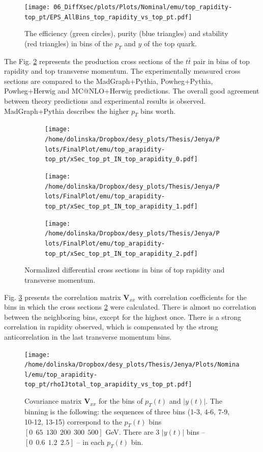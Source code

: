 \begin{figure}[t]
  \centering
  \texttt{[image: 06\_DiffXsec/plots/Plots/Nominal/emu/top\_rapidity-top\_pt/EPS\_AllBins\_top\_rapidity\_vs\_top\_pt.pdf]}
  \caption{The efficiency (green circles), purity (blue triangles) and stability (red triangles) in bins of the $p_{T}$ and $y$ of the top quark.}
  \label{fig:EPS_2D_y_pt}
\end{figure}

The Fig. \ref{fig:XS_2D_y_pt} represents the production cross sections of the $t\bar{t}$ pair in bins of top rapidity and top transverse momentum.
The experimentally measured cross sections are compared to the MadGraph+Pythia, Powheg+Pythia, Powheg+Herwig and MC@NLO+Herwig predictions.
The overall good agreement between theory predictions and experimental results is observed. MadGraph+Pythia describes the higher $p_{T}$ bins
worth.

\begin{figure}[p]
\centering
\begin{subfigure}
  \centering
  \texttt{[image: /home/dolinska/Dropbox/desy\_plots/Thesis/Jenya/Plots/FinalPlot/emu/top\_arapidity-top\_pt/xSec\_top\_pt\_IN\_top\_arapidity\_0.pdf]}
\end{subfigure}
\begin{subfigure}
  \centering
  \texttt{[image: /home/dolinska/Dropbox/desy\_plots/Thesis/Jenya/Plots/FinalPlot/emu/top\_arapidity-top\_pt/xSec\_top\_pt\_IN\_top\_arapidity\_1.pdf]}
\end{subfigure}
\begin{subfigure}
  \centering
  \texttt{[image: /home/dolinska/Dropbox/desy\_plots/Thesis/Jenya/Plots/FinalPlot/emu/top\_arapidity-top\_pt/xSec\_top\_pt\_IN\_top\_arapidity\_2.pdf]}
\end{subfigure}
\caption{Normalized differential cross sections in bins of top rapidity and transverse momentum.}
\label{fig:XS_2D_y_pt}
\end{figure}

Fig. \ref{fig:corr_matr} presents the correlation matrix $\mathbf{V}_{xx}$ with correlation coefficients for the bins in which the 
cross sections \ref{fig:XS_2D_y_pt} were calculated. There is almost no correlation between the neighboring bins, except for the highest
once. There is a strong correlation in rapidity observed, which is compensated by the strong anticorrelation in the last transverse momentum
bins.

\begin{figure}[t]
  \centering
  \texttt{[image: /home/dolinska/Dropbox/desy\_plots/Thesis/Jenya/Plots/Nominal/emu/top\_arapidity-top\_pt/rhoIJtotal\_top\_arapidity\_vs\_top\_pt.pdf]}
  \caption{Covariance matrix $\mathbf{V}_{xx}$ for the bins of $p_{T}(t)$ and $|y(t)|$. The binning is the following:
  the sequences of three bins (1-3, 4-6, 7-9, 10-12, 13-15) correspond to the $p_{T}(t)$ bins $[0\:\:65\:\:130\:\:200\:\:300\:\:500]$ GeV.
          There are 3 $|y(t)|$ bins -- $[0\:\:0.6\:\:1.2\:\:2.5]$ -- in each $p_{T}(t)$ bin.}
  \label{fig:corr_matr}
\end{figure}